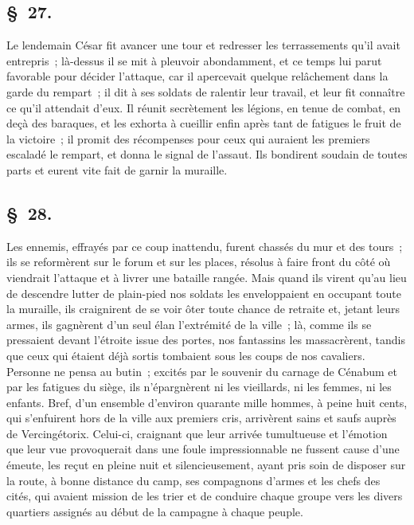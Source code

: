 \documentclass[french,twoside]{book} %
\begin{document}
\subsection[{§ 27.}]{ \textsc{§ 27.} }
\noindent Le lendemain César fit avancer une tour et redresser les terrassements qu’il avait entrepris ; là-dessus il se mit à pleuvoir abondamment, et ce temps lui parut favorable pour décider l’attaque, car il apercevait quelque relâchement dans la garde du rempart ; il dit à ses soldats de ralentir leur travail, et leur fit connaître ce qu’il attendait d’eux. Il réunit secrètement les légions, en tenue de combat, en deçà des baraques, et les exhorta à cueillir enfin après tant de fatigues le fruit de la victoire ; il promit des récompenses pour ceux qui auraient les premiers escaladé le rempart, et donna le signal de l’assaut. Ils bondirent soudain de toutes parts et eurent vite fait de garnir la muraille.
\subsection[{§ 28.}]{ \textsc{§ 28.} }
\noindent Les ennemis, effrayés par ce coup inattendu, furent chassés du mur et des tours ; ils se reformèrent sur le forum et sur les places, résolus à faire front du côté où viendrait l’attaque et à livrer une bataille rangée. Mais quand ils virent qu’au lieu de descendre lutter de plain-pied nos soldats les enveloppaient en occupant toute la muraille, ils craignirent de se voir ôter toute chance de retraite et, jetant leurs armes, ils gagnèrent d’un seul élan l’extrémité de la ville ; là, comme ils se pressaient devant l’étroite issue des portes, nos fantassins les massacrèrent, tandis que ceux qui étaient déjà sortis tombaient sous les coups de nos cavaliers. Personne ne pensa au butin ; excités par le souvenir du carnage de Cénabum et par les fatigues du siège, ils n’épargnèrent ni les vieillards, ni les femmes, ni les enfants. Bref, d’un ensemble d’environ quarante mille hommes, à peine huit cents, qui s’enfuirent hors de la ville aux premiers cris, arrivèrent sains et saufs auprès de Vercingétorix. Celui-ci, craignant que leur arrivée tumultueuse et l’émotion que leur vue provoquerait dans une foule impressionnable ne fussent cause d’une émeute, les reçut en pleine nuit et silencieusement, ayant pris soin de disposer sur la route, à bonne distance du camp, ses compagnons d’armes et les chefs des cités, qui avaient mission de les trier et de conduire chaque groupe vers les divers quartiers assignés au début de la campagne à chaque peuple.
\end{document}
